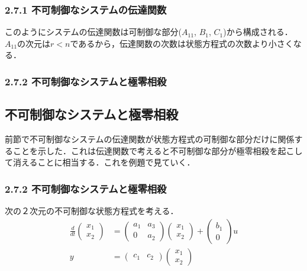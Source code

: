 \begin{frame}[t]
\frametitle{2.7.1 不可制御なシステムの伝達関数}
このようにシステムの伝達関数は可制御な部分($A_{11}$, $B_1$, $C_1$)から構成される．$A_{11}$の次元は$r < n$であるから，伝達関数の次数は状態方程式の次数より小さくなる．

\end{frame}

\begin{frame}[t]
\frametitle{2.7.2 不可制御なシステムと極零相殺}
\subsection{不可制御なシステムと極零相殺}

前節で不可制御なシステムの伝達関数が状態方程式の可制御な部分だけに関係することを示した．これは伝達関数で考えると不可制御な部分が極零相殺を起こして消えることに相当する．これを例題で見ていく．

\end{frame}

\begin{frame}[t]
\frametitle{2.7.2 不可制御なシステムと極零相殺}
次の２次元の不可制御な状態方程式を考える．
\begin{align}
 \frac{d}{dt}
  \left(\begin{array}{c}
         {x}_1 \\
	 {x}_2 
	\end{array}\right)
  &=
  \left(\begin{array}{cc}
         a_1 & a_3 \\
	     0 & a_2
	\end{array}\right)
  \left(\begin{array}{c}
         {x}_1 \\
	 {x}_2 
	\end{array}\right)
  +
  \left(\begin{array}{c}
         b_1 \\
	 0
	\end{array}\right)
  u \\
 y &=
  \left(\begin{array}{cc}
         c_1 & c_2 
	\end{array}\right)
  \left(\begin{array}{c}
         {x}_1 \\
	 {x}_2 
	\end{array}\right)
\end{align}
\end{frame}

